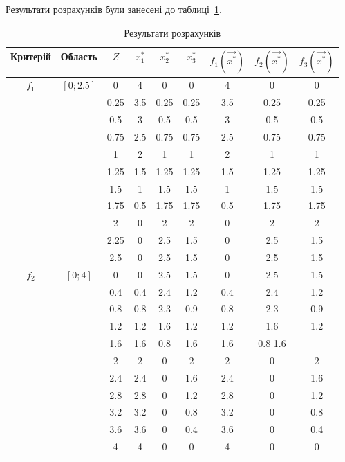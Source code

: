 Результати розрахунків були занесені до
таблиці~\ref{tab:result}.

        \begin{table}[H]        
            \caption{Результати розрахунків}
            \label{tab:result}
            \small
        \begin{tabular}{c|c|c|c c c|c c c}
            Критерій & Область & $Z$ & $x^*_1$ & $x^*_2$ & $x^*_3$ & $f_1(\vec{x^*})$ & $f_2(\vec{x^*})$ & $f_3(\vec{x^*})$ \\
            \hline

            \multirow{11}{*}{$f_1$} & \multirow{11}{*}{$[0;2.5]$} &
            0 & 4 & 0 & 0 & 4 & 0 & 0 \\
            & & 0.25 & 3.5 & 0.25 & 0.25 & 3.5 & 0.25 & 0.25 \\
            & & 0.5 & 3 & 0.5 & 0.5 & 3 & 0.5 & 0.5 \\
            & & 0.75 & 2.5 & 0.75 & 0.75 & 2.5 & 0.75 & 0.75 \\
            & & 1 & 2 & 1 & 1 & 2 & 1 & 1 \\
            & & 1.25 & 1.5 & 1.25 & 1.25 & 1.5 & 1.25 & 1.25 \\
            & & 1.5 & 1 & 1.5 & 1.5 & 1 & 1.5 & 1.5 \\
            & & 1.75 & 0.5 & 1.75 & 1.75 & 0.5 & 1.75 & 1.75 \\
            & & 2 & 0 & 2 & 2 & 0 & 2 & 2 \\
            & & 2.25 & 0 & 2.5 & 1.5 & 0 & 2.5 & 1.5 \\
            & & 2.5 & 0 & 2.5 & 1.5 & 0 & 2.5 & 1.5 \\
            \hline

            \multirow{11}{*}{$f_2$} & \multirow{11}{*}{$[0;4]$} &
            0 & 0 &  2.5& 1.5 &0 &  2.5 &1.5 \\
            & & 0.4& 0.4& 2.4& 1.2& 0.4& 2.4& 1.2 \\
            & & 0.8 &0.8& 2.3& 0.9& 0.8& 2.3& 0.9 \\
            & & 1.2 &1.2& 1.6& 1.2& 1.2& 1.6& 1.2 \\
            & & 1.6& 1.6& 0.8& 1.6& 1.6& 0.8 1.6 \\ 
            & & 2  & 2  & 0 &  2  & 2  & 0  & 2 \\ 
            & & 2.4& 2.4& 0 &  1.6& 2.4& 0 &  1.6 \\
            & & 2.8& 2.8& 0 &  1.2& 2.8& 0&   1.2 \\
            & & 3.2& 3.2& 0 &  0.8& 3.2& 0 &  0.8 \\
            & & 3.6& 3.6& 0 &  0.4& 3.6& 0 &  0.4 \\
            & & 4  & 4  & 0 &  0  & 4  & 0 &  0 \\
            \hline 


\end{tabular}
\end{table}
